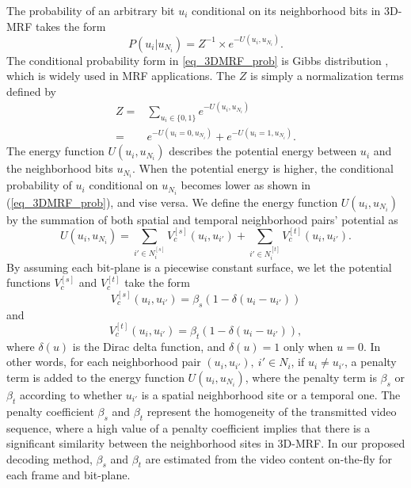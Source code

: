 \documentclass[10pt,twocolumn,twoside]{IEEEtran}
\begin{document}
The probability of an arbitrary bit $u_i$ conditional on its neighborhood bits in 3D-MRF takes the form
\begin{equation}
P(u_i | u_{N_i}) = Z^{-1}\times e^{-U(u_i,u_{N_i})}.
\label{eq_3DMRF_prob}
\end{equation}
The conditional probability form in \ref{eq_3DMRF_prob} is Gibbs distribution \cite{besag1974spatial}, which is widely used in MRF applications. The $Z$ is simply a normalization terms defined by
\begin{align}
Z =& \sum_{u_i \in \{0,1\}}e^{-U(u_i, u_{N_i})}\\
=& e^{-U(u_i=0, u_{N_i})} + e^{-U(u_i=1, u_{N_i})}.
\end{align}
The energy function $U(u_i,u_{N_i})$ describes the potential energy between $u_i$ and the neighborhood bits $u_{N_i}$. When the potential energy is higher, the conditional probability of $u_i$ conditional on $u_{N_i}$ becomes lower as shown in (\ref{eq_3DMRF_prob}), and vise versa. We define the energy function $U(u_i,u_{N_i})$ by the summation of both spatial and temporal neighborhood pairs' potential as
\begin{equation}
U(u_i, u_{N_i}) =  \sum_{i'  \in N_i^{[s]}}V_c^{[s]}(u_i, u_{i'}) + \sum_{i'  \in N_i^{[t]}} V_c^{[t]}(u_i, u_{i'}).
\label{eq_energy_function}
\end{equation}
By assuming each bit-plane is a piecewise constant surface, we let the potential functions $V_c^{[s]}$ and $V_c^{[t]}$ take the form
\begin{equation}
V_c^{[s]}(u_i, u_{i'}) = \beta_s (1- \delta(u_i - u_{i'}))
\label{eq_potential_spatial}
\end{equation}
and
\begin{equation}
V_c^{[t]}(u_i, u_{i'}) = \beta_t (1- \delta(u_i - u_{i'})),
\label{eq_potential_temporal}
\end{equation}
where $\delta(u)$ is the Dirac delta function, and $\delta(u) = 1$ only when $u=0$. In other words, for each neighborhood pair $(u_i, u_{i'}),\ i' \in N_i$, if $u_i \neq u_{i'}$, a penalty term is added to the energy function $U(u_i, u_{N_i})$, where the penalty term is $\beta_s$ or $\beta_t$ according to whether $u_{i'}$ is a spatial neighborhood site or a temporal one. The penalty coefficient $\beta_s$ and $\beta_t$ represent the homogeneity of the transmitted video sequence, where a high value of a penalty coefficient implies that there is a significant similarity between the neighborhood sites in 3D-MRF. In our proposed decoding method, $\beta_s$ and $\beta_t$ are estimated from the video content on-the-fly for each frame and bit-plane. 
\end{document}
